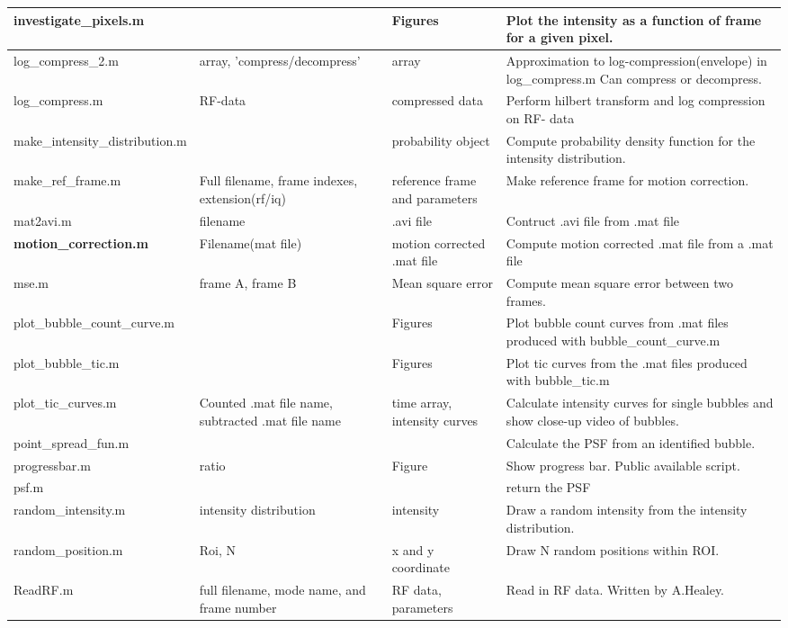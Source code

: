 \begin{center}
\begin{longtable}{@{} p{3cm} p{3cm} p{2cm} p{4cm} @{}}
			investigate\_pixels.m &  & Figures & Plot the intensity as a function of frame for a given pixel. \\ \hline 
			log\_compress\_2.m & array, 'compress/decompress' & array & Approximation to log-compression(envelope) in log\_compress.m Can compress or decompress. \\ \hline 
			log\_compress.m & RF-data & compressed data & Perform hilbert transform and log  compression on RF- data \\ \hline 
			make\_intensity\_distribution.m &  & probability object & Compute probability density function for the intensity distribution. \\ \hline 
			make\_ref\_frame.m & Full filename, frame indexes, extension(rf/iq) & reference frame and parameters & Make reference frame for motion correction. \\ \hline 
			mat2avi.m & filename & .avi file & Contruct .avi file from .mat file \\ \hline 
			\textbf{motion\_correction.m} & Filename(mat file) & motion corrected .mat file & Compute motion corrected .mat file from a .mat file \\ \hline 
			mse.m & frame A, frame B & Mean square error & Compute mean square error between two frames. \\ \hline 
			plot\_bubble\_count\_curve.m &  & Figures & Plot bubble count curves from .mat files produced with bubble\_count\_curve.m \\ \hline 
			plot\_bubble\_tic.m &  & Figures & Plot tic curves from the .mat files produced with bubble\_tic.m \\ \hline 
			plot\_tic\_curves.m & Counted .mat file name, subtracted .mat file name & time array, intensity curves & Calculate intensity curves for single bubbles and show close-up video of bubbles. \\ \hline 
			point\_spread\_fun.m &  &  & Calculate the PSF from an identified bubble. \\ \hline 
			progressbar.m & ratio & Figure & Show progress bar.  Public available script. \\ \hline 
			psf.m &  &  & return the PSF \\ \hline 
			random\_intensity.m & intensity distribution & intensity & Draw a random intensity from the intensity distribution. \\ \hline 
			random\_position.m & Roi, N & x and y coordinate & Draw N random positions within ROI. \\ \hline 
			ReadRF.m & full filename, mode name, and frame number & RF data, parameters & Read in RF data. Written by A.Healey. \\ \hline 

\end{longtable}
\end{center}

